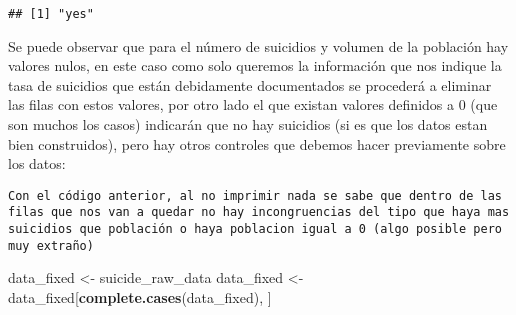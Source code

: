 \documentclass[]{article}
\newenvironment{Shaded}{\begin{snugshade}}{\end{snugshade}}
\newcommand{\KeywordTok}[1]{\textcolor[rgb]{0.13,0.29,0.53}{\textbf{#1}}}
\newcommand{\DecValTok}[1]{\textcolor[rgb]{0.00,0.00,0.81}{#1}}
\newcommand{\StringTok}[1]{\textcolor[rgb]{0.31,0.60,0.02}{#1}}
\newcommand{\ControlFlowTok}[1]{\textcolor[rgb]{0.13,0.29,0.53}{\textbf{#1}}}
\newcommand{\OperatorTok}[1]{\textcolor[rgb]{0.81,0.36,0.00}{\textbf{#1}}}
\newcommand{\NormalTok}[1]{#1}
\begin{document}
\begin{verbatim}
## [1] "yes"
\end{verbatim}

Se puede observar que para el número de suicidios y volumen de la
población hay valores nulos, en este caso como solo queremos la
información que nos indique la tasa de suicidios que están debidamente
documentados se procederá a eliminar las filas con estos valores, por
otro lado el que existan valores definidos a 0 (que son muchos los
casos) indicarán que no hay suicidios (si es que los datos estan bien
construidos), pero hay otros controles que debemos hacer previamente
sobre los datos:

\begin{Shaded}
\end{Shaded}

\begin{verbatim}
Con el código anterior, al no imprimir nada se sabe que dentro de las filas que nos van a quedar no hay incongruencias del tipo que haya mas suicidios que población o haya poblacion igual a 0 (algo posible pero muy extraño)
\end{verbatim}

\begin{Shaded}
\begin{Highlighting}[]
\NormalTok{data_fixed <-}\StringTok{ }\NormalTok{suicide_raw_data}
\NormalTok{data_fixed <-}\StringTok{ }\NormalTok{data_fixed[}\KeywordTok{complete.cases}\NormalTok{(data_fixed), ]}
\end{Highlighting}
\end{Shaded}
\end{document}

